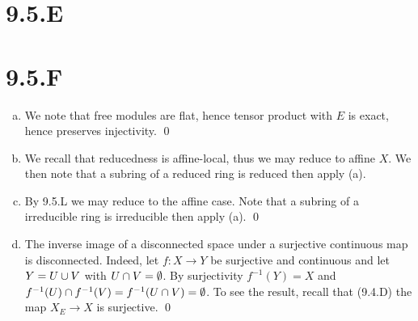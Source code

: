 \documentclass{article}
\begin{document}
\section{9.5.E}

\section{9.5.F}
\begin{enumerate}[a.]
    \item We note that free modules are flat, hence tensor product with
          $E$ is exact, hence preserves injectivity. \qed
    \item We recall that reducedness is affine-local, thus we may reduce to affine
          $X$. We then note that a subring of a reduced ring is
          reduced then apply (a).
    \item By 9.5.L we may reduce to the affine case. Note that a subring of a irreducible
          ring is irreducible then apply (a). \qed
    \item The inverse image of a disconnected space under a surjective continuous map is
          disconnected. Indeed, let $f: X \to Y$ be surjective and continuous
          and let $Y=U \cup V$ with $U \cap V = \emptyset$. By surjectivity
          $f^{-1}(Y)=X$ and $f^{-1}(U) \cap
              f^{-1}(V)=f^{-1}(U \cap V) = \emptyset$. To see the result, recall
          that (9.4.D) the map $X_E \to X$ is surjective. \qed
\end{enumerate}
\end{document}
